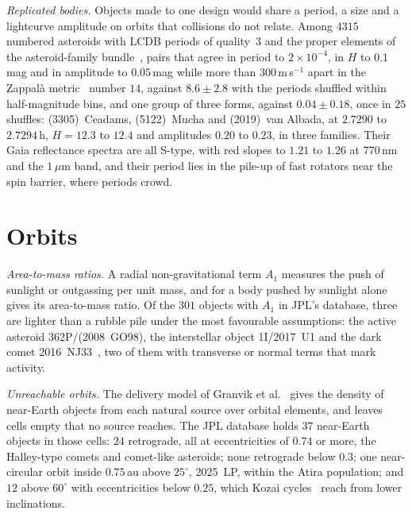 \documentclass[3p,11pt]{elsarticle}
\begin{document}
\emph{Replicated bodies.} Objects made to one design would share a period, a size and a
lightcurve amplitude on orbits that collisions do not relate. Among $4315$ numbered
asteroids with LCDB periods of quality~$3$ and the proper elements of the asteroid-family
bundle~\cite{Nesvorny2015}, pairs that agree in period to $2\times10^{-4}$, in $H$ to
$0.1$\,mag and in amplitude to $0.05$\,mag while more than $300$\,m\,s$^{-1}$ apart in
the Zappal\`a metric~\cite{Zappala1990} number $14$, against $8.6\pm2.8$ with the periods
shuffled within half-magnitude bins, and one group of three forms, against
$0.04\pm0.18$, once in $25$ shuffles: (3305)~Ceadams, (5122)~Mucha and (2019)~van Albada,
at $2.7290$ to $2.7294$\,h, $H=12.3$ to $12.4$ and amplitudes $0.20$ to $0.23$, in three
families. Their Gaia reflectance spectra are all S-type, with red slopes to $1.21$ to
$1.26$ at $770$\,nm and the $1\,\mu$m band, and their period lies in the pile-up of fast
rotators near the spin barrier, where periods crowd.

\section{Orbits}\label{sec:orbits}

\emph{Area-to-mass ratios.} A radial non-gravitational term $A_1$ measures the push of
sunlight or outgassing per unit mass, and for a body pushed by sunlight alone gives its
area-to-mass ratio. Of the $301$ objects with $A_1$ in JPL's database, three are lighter
than a rubble pile under the most favourable assumptions: the active asteroid
362P/(2008~GO98), the interstellar object 1I/2017~U1 and the dark comet
2016~NJ33~\cite{Seligman2023}, two of them with transverse or normal terms that mark
activity.

\emph{Unreachable orbits.} The delivery model of Granvik et al.~\cite{Granvik2018} gives
the density of near-Earth objects from each natural source over orbital elements, and
leaves cells empty that no source reaches. The JPL database holds $37$ near-Earth objects
in those cells: $24$ retrograde, all at eccentricities of $0.74$ or more, the
Halley-type comets and comet-like asteroids; none retrograde below $0.3$; one
near-circular orbit inside $0.75$\,au above $25^\circ$, 2025~LP, within the Atira
population; and $12$ above $60^\circ$ with eccentricities below $0.25$, which Kozai
cycles~\cite{Kozai1962} reach from lower inclinations.
\end{document}
